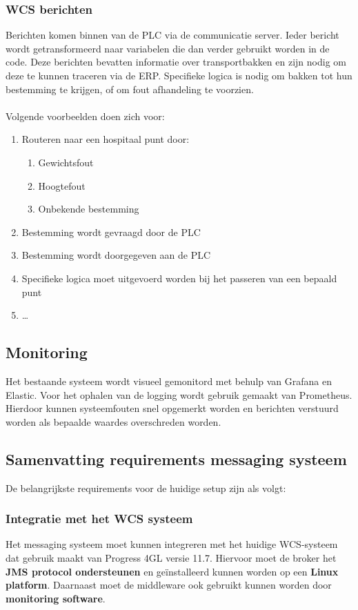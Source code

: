\subsubsection{WCS berichten} 
Berichten komen binnen van de PLC via de communicatie server. Ieder bericht wordt getransformeerd naar variabelen die dan verder gebruikt worden in de code.
Deze berichten bevatten informatie over transportbakken en zijn nodig om deze te kunnen traceren via de ERP.
Specifieke logica is nodig om bakken tot hun bestemming te krijgen, of om fout afhandeling te voorzien.
\\\\
Volgende voorbeelden doen zich voor:
\begin{enumerate}
\item Routeren naar een hospitaal punt door: 
\begin{enumerate}
  \item Gewichtsfout
  \item Hoogtefout
  \item Onbekende bestemming
\end{enumerate}
\item Bestemming wordt gevraagd door de PLC
\item Bestemming wordt doorgegeven aan de PLC 
\item Specifieke logica moet uitgevoerd worden bij het passeren van een bepaald punt
\item \dots
\end{enumerate}

\subsection{Monitoring}
Het bestaande systeem wordt visueel gemonitord met behulp van Grafana en Elastic. 
Voor het ophalen van de logging wordt gebruik gemaakt van Prometheus.
Hierdoor kunnen systeemfouten snel opgemerkt worden en berichten verstuurd worden als bepaalde waardes overschreden worden.
\newpage

\subsection{Samenvatting requirements messaging systeem}
De belangrijkste requirements voor de huidige setup zijn als volgt:

\subsubsection{Integratie met het WCS systeem}
Het messaging systeem moet kunnen integreren met het huidige WCS-systeem dat gebruik maakt van Progress 4GL versie 11.7. 
Hiervoor moet de broker het \textbf{JMS protocol ondersteunen} en geïnstalleerd kunnen worden op een \textbf{Linux platform}.
Daarnaast moet de middleware ook gebruikt kunnen worden door \textbf{monitoring software}.

